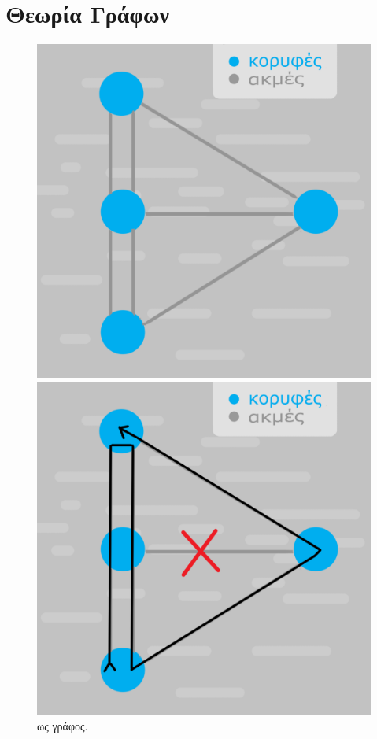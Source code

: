 \section{Θεωρία Γράφων}

\begin{figure}[ht]
    \begin{minipage}[c]{.46\linewidth}
        \centering
        \includegraphics[scale=0.15]{2947_thesis/pictures/konigsberGraph.png}
        \caption{ ως γράφος.}
        \label{3}
    \end{minipage}
    \hfill%
    \begin{minipage}[c]{.46\linewidth}
        \centering
        \includegraphics[scale=0.15]{2947_thesis/pictures/konigsbergEuler.png}

\end{minipage}
\end{figure}
